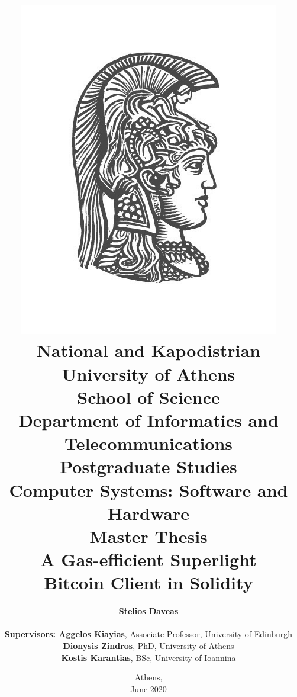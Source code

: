 \title{
    {\includegraphics[scale=0.8]{figures/logo_uoa.jpg}}\\
    {\large National and Kapodistrian University of Athens \\
    School of Science \\
    Department of Informatics and Telecommunications}\\
    \vspace{1cm}
    Postgraduate Studies \\
    Computer Systems: Software and Hardware\\
    \vspace{10mm}
    {Master Thesis}\\
    \vspace{3mm}
    {\textbf{\LARGE A Gas-efficient Superlight\\Bitcoin Client in Solidity}}\\

    }

\author{
    \textbf{Stelios Daveas} \\
    \vspace{1cm} \\
    \textbf{Supervisors: Aggelos Kiayias}, Associate Professor, University of Edinburgh\\
    \hspace{0.30cm}
    \textbf{Dionysis Zindros}, PhD, University of Athens\\
    \hspace{0.45cm}
    \textbf{Kostis Karantias}, BSc, University of Ioannina
    \vspace{2cm}
}

\date{Athens, \\ June 2020}
\maketitle


